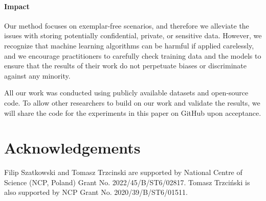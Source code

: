 \documentclass[10pt,twocolumn,letterpaper]{article}
\begin{document}


\vspace{-0.5cm}
\paragraph{Impact} 
Our method focuses on exemplar-free scenarios, and therefore we alleviate the issues with storing potentially confidential, private, or sensitive data.
However, we recognize that machine learning algorithms can be harmful if applied carelessly, and we encourage practitioners to carefully check training data and the models to ensure that the results of their work do not perpetuate biases or discriminate against any minority.

All our work was conducted using publicly available datasets and open-source code. To allow other researchers to build on our work and validate the results, we will share the code for the experiments in this paper on GitHub upon acceptance.

\section*{Acknowledgements}
Filip Szatkowski and Tomasz Trzcinski are supported by National Centre of Science (NCP, Poland) Grant No. 2022/45/B/ST6/02817. Tomasz Trzciński is also supported by NCP Grant No. 2020/39/B/ST6/01511.

{\small


}

\clearpage


\end{document}
